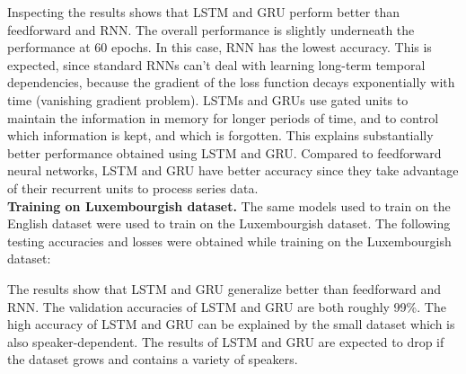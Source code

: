 Inspecting the results shows that LSTM and GRU perform better than feedforward
and RNN. The overall performance is slightly underneath the performance at 60
epochs. In this case, RNN has the lowest accuracy. This is expected, since
standard RNNs can't deal with learning long-term temporal dependencies, because
the gradient of the loss function decays exponentially with time (vanishing
gradient problem). LSTMs and GRUs use gated units to maintain the information in
memory for longer periods of time, and to control which information is kept, and
which is forgotten. This explains substantially better performance obtained
using LSTM and GRU. Compared to feedforward neural networks, LSTM and GRU have
better accuracy since they take advantage of their recurrent units to process
series data.\\

\textbf{Training on Luxembourgish dataset.} The same models used to train on the
English dataset were used to train on the Luxembourgish dataset. The following
testing accuracies and losses were obtained while training on the Luxembourgish
dataset:

\begin{table}[H]
    \centering
\end{table}

The results show that LSTM and GRU generalize better than feedforward and RNN.
The validation accuracies of LSTM and GRU are both roughly 99\%. The high
accuracy of LSTM and GRU can be explained by the small dataset which is also
speaker-dependent.  The results of LSTM and GRU are expected to drop if the
dataset grows and contains a variety of speakers.\\

